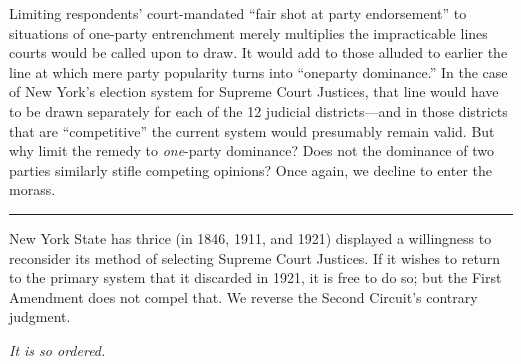   Limiting respondents' court-mandated ``fair shot at party endorsement'' to situations of one-party entrenchment merely multiplies the impracticable lines courts would be called upon to draw. It would add to those alluded to earlier the line at which mere party popularity turns into ``oneparty dominance.'' In the case of New York's election system for Supreme Court Justices, that line would have to be drawn separately for each of the 12 judicial districts---and in those districts that are ``competitive'' the current system \newpage  would presumably remain valid. But why limit the remedy to \emph{one}-party dominance? Does not the dominance of two parties similarly stifle competing opinions? Once again, we decline to enter the morass.

\hrule

  New York State has thrice (in 1846, 1911, and 1921) displayed a willingness to reconsider its method of selecting Supreme Court Justices. If it wishes to return to the primary system that it discarded in 1921, it is free to do so; but the First Amendment does not compel that. We reverse the Second Circuit's contrary judgment.

\begin{flushright}\emph{It is so ordered.}\end{flushright}
